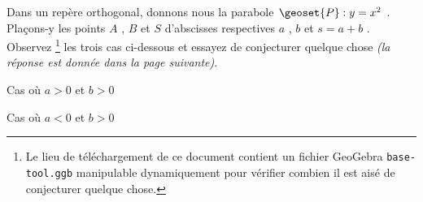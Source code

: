 Dans un repère orthogonal, donnons nous la parabole $\geoset{P} : y = x^2$ . Plaçons-y les points $A$ , $B$ et $S$ d'abscisses respectives $a$ , $b$ et  $s = a + b$ .
Observez
\footnote{
	Le lieu de téléchargement de ce document contient un fichier GeoGebra \texttt{base-tool.ggb} manipulable dynamiquement pour vérifier combien il est aisé de conjecturer quelque chose.
}
les trois cas ci-dessous et essayez de conjecturer quelque chose \emph{(la réponse est donnée dans la page suivante)}.


\vspace{2.5em}

\begin{multicols}{2}
	\center
	\footnotesize
	\itshape
	
	
	\smallskip
	Cas où $a > 0$ et $b > 0$

	\columnbreak
	
	
	\smallskip
	Cas où $a < 0$ et $b > 0$
\end{multicols}
	
